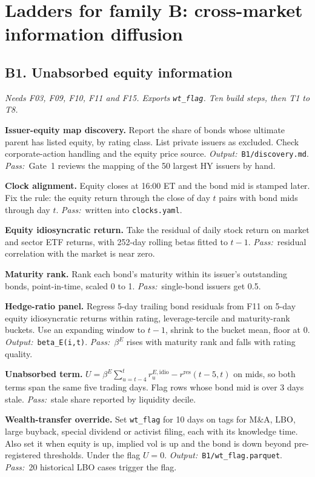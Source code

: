 \documentclass[11pt,letterpaper]{article}
\makeatletter
\newcommand{\code}[1]{\texttt{#1}}
\newcommand{\rres}{r^{\mathrm{res}}}      %
\newcommand*{\twodigit}[1]{\expandafter\@twodigit\csname c@#1\endcsname}
\newcommand*{\@twodigit}[1]{\ifnum#1<10 0\fi\number#1}
\newcommand{\stepname}[1]{\textbf{#1.}}
\newcommand{\Out}{\textit{Output:}~}
\newcommand{\Pass}{\textit{Pass:}~}
\makeatother
\begin{document}
\section{Ladders for family B: cross-market information diffusion}
\label{sec:laddersB}

\subsection{B1. Unabsorbed equity information}
\emph{Needs F03, F09, F10, F11 and F15. Exports \code{wt_flag}. Ten build steps, then T1 to T8.}
\begin{ladder}[label=\textbf{B1.\twodigit*}]
\item \stepname{Issuer-equity map discovery} Report the share of bonds whose ultimate parent has listed equity, by rating class. List private issuers as excluded. Check corporate-action handling and the equity price source. \Out \code{B1/discovery.md}. \Pass Gate~1 reviews the mapping of the 50 largest HY issuers by hand.
\item \stepname{Clock alignment} Equity closes at 16:00 ET and the bond mid is stamped later. Fix the rule: the equity return through the close of day $t$ pairs with bond mids through day $t$. \Pass written into \code{clocks.yaml}.
\item \stepname{Equity idiosyncratic return} Take the residual of daily stock return on market and sector ETF returns, with 252-day rolling betas fitted to $t-1$. \Pass residual correlation with the market is near zero.
\item \stepname{Maturity rank} Rank each bond's maturity within its issuer's outstanding bonds, point-in-time, scaled 0 to 1. \Pass single-bond issuers get 0.5.
\item \stepname{Hedge-ratio panel} Regress 5-day trailing bond residuals from F11 on 5-day equity idiosyncratic returns within rating, leverage-tercile and maturity-rank buckets. Use an expanding window to $t-1$, shrink to the bucket mean, floor at 0. \Out \code{beta_E(i,t)}. \Pass $\beta^{E}$ rises with maturity rank and falls with rating quality.
\item \stepname{Unabsorbed term} $U=\beta^{E}\sum_{u=t-4}^{t}r^{E,\mathrm{idio}}_u-\rres(t-5,t)$ on mids, so both terms span the same five trading days. Flag rows whose bond mid is over 3 days stale. \Pass stale share reported by liquidity decile.
\item \stepname{Wealth-transfer override} Set \code{wt_flag} for 10 days on tags for M\&A, LBO, large buyback, special dividend or activist filing, each with its knowledge time. Also set it when equity is up, implied vol is up and the bond is down beyond pre-registered thresholds. Under the flag $U=0$. \Out \code{B1/wt_flag.parquet}. \Pass 20 historical LBO cases trigger the flag.

\end{ladder}
\end{document}
